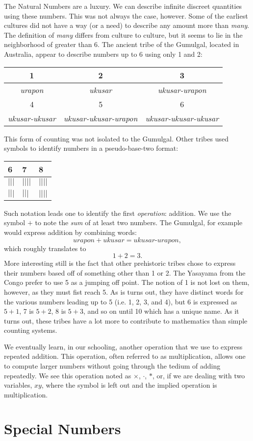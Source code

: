 The Natural Numbers are a luxury. We can describe infinite discreet quantities using these numbers. This was not always the case, however. Some of the earliest cultures did not have a way (or a need) to describe any amount more than \textit{many}. The definition of \textit{many} differs from culture to culture, but it seems to lie in the neighborhood of greater than 6. The ancient tribe of the Gumulgal, located in Australia, appear to describe numbers up to 6 using only 1 and 2:
\begin{center}
    \begin{tabular}{|c | c | c |}
        \hline
        1 & 2 & 3 \\
        \hline
        \textit{urapon} & \textit{ukusar} & \textit{ukusar-urapon}\\
        \hline
        4 & 5 & 6\\
        \hline
        \textit{ukusar-ukusar} & \textit{ukusar-ukusar-urapon} & \textit{ukusar-ukusar-ukusar}\\
        \hline
    \end{tabular}
\end{center}
This form of counting was not isolated to the Gumulgal. Other tribes used symbols to identify numbers in a pseudo-base-two format:
\begin{center}
    \begin{tabular}{l | l | l}
        6 & 7 & 8\\
        \hline
        $|||$ & $||||$ & $||||$\\
        $|||$ & $|||$ & $||||$
    \end{tabular}
\end{center}
Such notation leads one to identify the first \textit{operation}: addition. We use the symbol $+$ to note the \textit{sum} of at least two numbers. The Gumulgal, for example would express addition by combining words:
\[
urapon + ukusar = ukusar\text{-}urapon,
\]
which roughly translates to
\[
1 + 2 = 3.
\]
More interesting still is the fact that other prehistoric tribes chose to express their numbers based off of something other than 1 or 2. The Yasayama from the Congo prefer to use 5 as a jumping off point. The notion of 1 is not lost on them, however, as they must fist reach 5. As is turns out, they have distinct words for the various numbers leading up to 5 (i.e. 1, 2, 3, and 4), but 6 is expressed as $5+1$, 7 is $5+2$, 8 is $5+3$, and so on until 10 which has a unique name. As it turns out, these tribes have a lot more to contribute to mathematics than simple counting systems.

We eventually learn, in our schooling, another operation that we use to express repeated addition. This operation, often referred to as multiplication, allows one to compute larger numbers without going through the tedium of adding repeatedly. We see this operation noted as $\times$, $\cdot$, $*$, or, if we are dealing with two variables, $xy$, where the symbol is left out and the implied operation is multiplication.

\section{Special Numbers}

